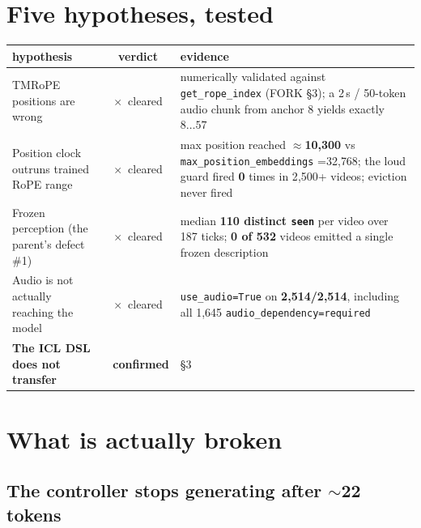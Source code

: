 \documentclass[11pt,a4paper]{article}
\newcommand{\yes}{\textcolor{black!70}{\checkmark}}
\newcommand{\no}{\textcolor{black!70}{$\times$}}
\begin{document}
\section{Five hypotheses, tested}

\begin{center}\small
\begin{tabular}{p{5.4cm}cp{7.6cm}}
\toprule
hypothesis & verdict & evidence \\
\midrule
TMRoPE positions are wrong & \no\ cleared &
numerically validated against \texttt{get\_rope\_index} (FORK \S3); a 2\,s / 50-token
audio chunk from anchor 8 yields exactly $8\ldots57$ \\
Position clock outruns trained RoPE range & \no\ cleared &
max position reached $\approx$\textbf{10{,}300} vs \texttt{max\_position\_embeddings}
=32{,}768; the loud guard fired \textbf{0} times in 2{,}500+ videos; eviction never fired \\
Frozen perception (the parent's defect \#1) & \no\ cleared &
median \textbf{110 distinct \texttt{seen}} per video over 187 ticks;
\textbf{0 of 532} videos emitted a single frozen description \\
Audio is not actually reaching the model & \no\ cleared &
\texttt{use\_audio=True} on \textbf{2{,}514/2{,}514}, including all 1{,}645
\texttt{audio\_dependency=required} \\
\textbf{The ICL DSL does not transfer} & \yes\ \textbf{confirmed} & \S3 \\
\bottomrule
\end{tabular}
\end{center}

\section{What is actually broken}

\subsection{The controller stops generating after $\sim$22 tokens}
\end{document}

